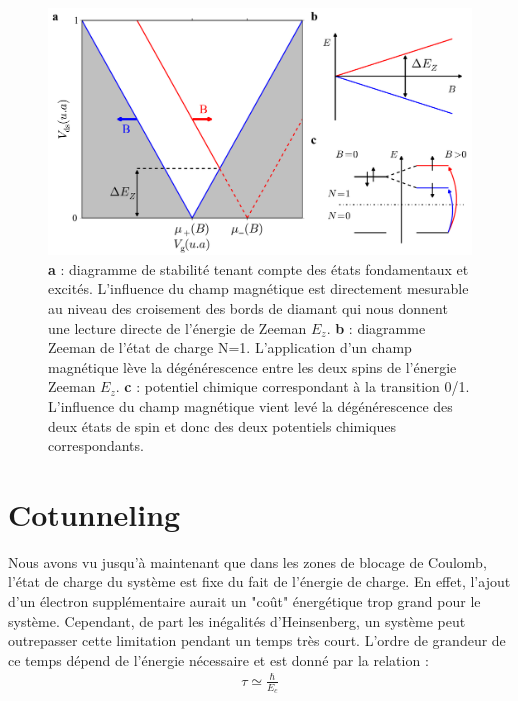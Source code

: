 \begin{figure}
\includegraphics[scale=0.5]{Theorie/Transport/figure4/figure4.pdf} 
\caption{ \textbf{a} : diagramme de stabilité tenant compte des états fondamentaux et excités. L'influence du champ magnétique est directement mesurable au niveau des croisement des bords de diamant qui nous donnent une lecture directe de l'énergie de Zeeman $E_z$. \textbf{b} : diagramme Zeeman de l'état de charge N=1. L'application d'un champ magnétique lève la dégénérescence entre les deux spins de l'énergie Zeeman $E_z$. \textbf{c} : potentiel chimique correspondant à la transition 0/1. L'influence du champ magnétique vient levé la dégénérescence des deux états de spin et donc des deux potentiels chimiques correspondants.}
\label{etat_excite}
\end{figure}

\section{Cotunneling}
Nous avons vu jusqu'à maintenant que dans les zones de blocage de Coulomb, l'état de charge du système est fixe du fait de l'énergie de charge. En effet, l'ajout d'un électron supplémentaire aurait un "co\^ut" énergétique trop grand pour le système. Cependant, de part les inégalités d'Heinsenberg, un système peut outrepasser cette limitation pendant un temps très court. L'ordre de grandeur de ce temps dépend de l'énergie nécessaire et est donné par la relation :
\begin{eqnarray}
\tau \simeq \frac{\hbar}{E_c} \nonumber
\end{eqnarray}


